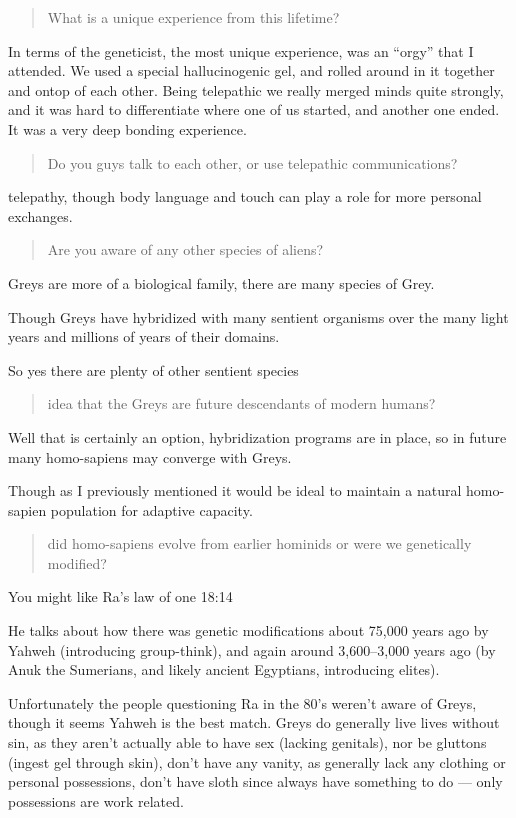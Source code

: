 \blockquote{What is a unique experience from this lifetime?}

In terms of the geneticist, the most unique experience, was an ``orgy'' that I
attended. We used a special hallucinogenic gel, and rolled around in it together
and ontop of each other. Being telepathic we really merged minds quite strongly,
and it was hard to differentiate where one of us started, and another one ended.
It was a very deep bonding experience.

\blockquote{Do you guys talk to each other, or use telepathic communications?}{}

telepathy, though body language and touch can play a role for more personal exchanges.

\blockquote{Are you aware of any other species of aliens?}


Greys are more of a biological family, there are many species of Grey.

Though Greys have hybridized with many sentient organisms over the many light
years and millions of years of their domains.

So yes there are plenty of other sentient species

\blockquote{idea that the Greys are future descendants of modern humans? }

Well that is certainly an option, hybridization programs are in place, so in
future many homo-sapiens may converge with Greys.

Though as I previously mentioned it would be ideal to maintain a natural
homo-sapien population for adaptive capacity.


\blockquote{did homo-sapiens evolve from earlier hominids or were we genetically
modified?}

You might like Ra's law of one 18:14

He talks about how there was genetic modifications about 75,000 years ago by
Yahweh (introducing group-think), and again around 3,600--3,000 years ago (by
Anuk the Sumerians, and likely ancient Egyptians, introducing elites).

Unfortunately the people questioning Ra in the 80's weren't aware of Greys,
though it seems Yahweh is the best match. Greys do generally live lives without
sin, as they aren't actually able to have sex (lacking genitals), nor be
gluttons (ingest gel through skin), don't have any vanity, as generally lack any
clothing or personal possessions, don't have sloth since always have something to
do --- only possessions are work related.

